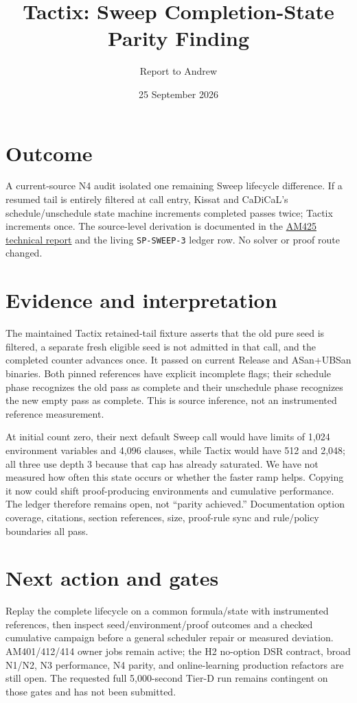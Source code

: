 \documentclass[11pt]{article}
\title{Tactix: Sweep Completion-State Parity Finding}
\author{Report to Andrew}
\date{25 September 2026}
\begin{document}
\maketitle
\vspace{-1.5em}

\section*{Outcome}
A current-source N4 audit isolated one remaining Sweep lifecycle difference.
If a resumed tail is entirely filtered at call entry, Kissat and CaDiCaL's
schedule/unschedule state machine increments completed passes twice; Tactix
increments once. The source-level derivation is documented in the
\href{../../benchmarks/reports/2026-09-25-am425-sweep-completion-state-audit.md}{AM425 technical report}
and the living \texttt{SP-SWEEP-3} ledger row. No solver or proof route changed.

\section*{Evidence and interpretation}
The maintained Tactix retained-tail fixture asserts that the old pure seed is
filtered, a separate fresh eligible seed is not admitted in that call, and
the completed counter advances once. It passed on current Release and
ASan+UBSan binaries. Both pinned references have explicit incomplete flags;
their schedule phase recognizes the old pass as complete and their unschedule
phase recognizes the new empty pass as complete. This is source inference,
not an instrumented reference measurement.

At initial count zero, their next default Sweep call would have limits of
1,024 environment variables and 4,096 clauses, while Tactix would have 512
and 2,048; all three use depth 3 because that cap has already saturated.
We have not measured how often this state occurs or whether the faster ramp
helps. Copying it now could shift proof-producing environments and cumulative
performance. The ledger therefore remains open, not ``parity achieved.''
Documentation option coverage, citations, section references, size, proof-rule
sync and rule/policy boundaries all pass.

\section*{Next action and gates}
Replay the complete lifecycle on a common formula/state with instrumented
references, then inspect seed/environment/proof outcomes and a checked
cumulative campaign before a general scheduler repair or measured deviation.
AM401/412/414 owner jobs remain active; the H2 no-option DSR contract, broad
N1/N2, N3 performance, N4 parity, and online-learning production refactors
are still open. The requested full 5,000-second Tier-D run remains contingent
on those gates and has not been submitted.
\end{document}
